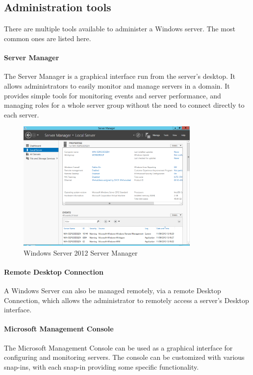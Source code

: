 \subsection{Administration tools}
\paragraph{}
There are multiple tools available to administer a Windows server. The most common ones are listed here.


\paragraph{Server Manager}
The Server Manager is a graphical interface run from the server's desktop. It allows administrators to easily monitor and manage servers in a domain. It provides simple tools for monitoring events and server performance, and managing roles for a whole server group without the need to connect directly to each server.

\begin{figure}[h!]
	\centering
	\includegraphics[width=0.8\textwidth]{Schemas/servermanager.png}
	\caption{Windows Server 2012 Server Manager}
	\label{fig:ws_sm}
\end{figure}

\paragraph{Remote Desktop Connection}
A Windows Server can also be managed remotely, via a remote Desktop Connection, which allows the administrator to remotely access a server's Desktop interface.

\paragraph{Microsoft Management Console}
The Microsoft Management Console can be used as a graphical interface for configuring and monitoring servers. The console can be customized with various snap-ins, with each snap-in providing some specific functionality.

